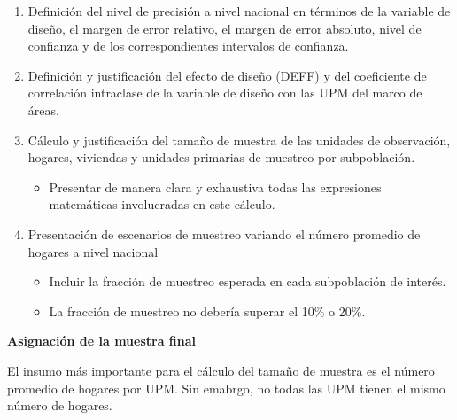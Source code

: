\begin{enumerate}
\def\labelenumi{\arabic{enumi}.}
\tightlist
\item
  Definición del nivel de precisión a nivel nacional en términos de la variable de diseño, el margen de error relativo, el margen de error absoluto, nivel de confianza y de los correspondientes intervalos de confianza.
\item
  Definición y justificación del efecto de diseño (DEFF) y del coeficiente de correlación intraclase de la variable de diseño con las UPM del marco de áreas.
\item
  Cálculo y justificación del tamaño de muestra de las unidades de observación, hogares, viviendas y unidades primarias de muestreo por subpoblación.

  \begin{itemize}
  \tightlist
  \item
    Presentar de manera clara y exhaustiva todas las expresiones matemáticas involucradas en este cálculo.
  \end{itemize}
\item
  Presentación de escenarios de muestreo variando el número promedio de hogares a nivel nacional

  \begin{itemize}
  \tightlist
  \item
    Incluir la fracción de muestreo esperada en cada subpoblación de interés.
  \item
    La fracción de muestreo no debería superar el 10\% o 20\%.
  \end{itemize}
\end{enumerate}

\textbf{Asignación de la muestra final}

El insumo más importante para el cálculo del tamaño de muestra es el número promedio de hogares por UPM. Sin emabrgo, no todas las UPM tienen el mismo número de hogares.

